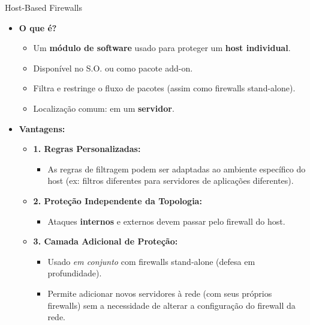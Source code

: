 \begin{frame}{Host-Based Firewalls }
    \begin{itemize}
        \item \textbf{O que é?}
              \begin{itemize}
                  \item Um \textbf{módulo de software} usado para proteger um \textbf{host individual}.
                  \item Disponível no S.O. ou como pacote add-on.
                  \item Filtra e restringe o fluxo de pacotes (assim como firewalls stand-alone).
                  \item Localização comum: em um \textbf{servidor}.
              \end{itemize}

        \item \textbf{Vantagens:}
              \begin{itemize}
                  \item \textbf{1. Regras Personalizadas:}
                        \begin{itemize}
                            \item As regras de filtragem podem ser adaptadas ao ambiente específico do host (ex: filtros diferentes para servidores de aplicações diferentes).
                        \end{itemize}
                  \item \textbf{2. Proteção Independente da Topologia:}
                        \begin{itemize}
                            \item Ataques \textbf{internos} e externos devem passar pelo firewall do host.
                        \end{itemize}
                  \item \textbf{3. Camada Adicional de Proteção:}
                        \begin{itemize}
                            \item Usado \textit{em conjunto} com firewalls stand-alone (defesa em profundidade).
                            \item Permite adicionar novos servidores à rede (com seus próprios firewalls) sem a necessidade de alterar a configuração do firewall da rede.
                        \end{itemize}
              \end{itemize}
    \end{itemize}
\end{frame}

